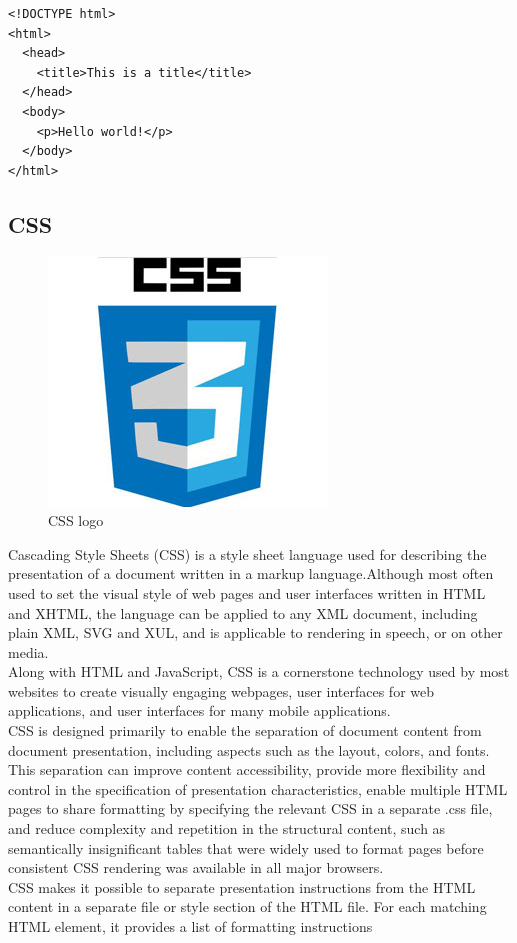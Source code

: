 \begin{verbatim}
<!DOCTYPE html>
<html>
  <head>
    <title>This is a title</title>
  </head>
  <body>
    <p>Hello world!</p>
  </body>
</html>

\end{verbatim}


\subsection{CSS}

\begin{figure}[h]
\centering \includegraphics[scale=0.50]{input/images/CSS.jpg}
\caption{CSS logo}
\end{figure}
Cascading Style Sheets (CSS) is a style sheet language used for describing the presentation of a document written in a markup language.Although most often used to set the visual style of web pages and user interfaces written in HTML and XHTML, the language can be applied to any XML document, including plain XML, SVG and XUL, and is applicable to rendering in speech, or on other media. \\
Along with HTML and JavaScript, CSS is a cornerstone technology used by most websites to create visually engaging webpages, user interfaces for web applications, and user interfaces for many mobile applications.\\
CSS is designed primarily to enable the separation of document content from document presentation, including aspects such as the layout, colors, and fonts.\\
 This separation can improve content accessibility, provide more flexibility and control in the specification of presentation characteristics, enable multiple HTML pages to share formatting by specifying the relevant CSS in a separate .css file, and reduce complexity and repetition in the structural content, such as semantically insignificant tables that were widely used to format pages before consistent CSS rendering was available in all major browsers.\\
 CSS makes it possible to separate presentation instructions from the HTML content in a separate file or style section of the HTML file. For each matching HTML element, it provides a list of formatting instructions

